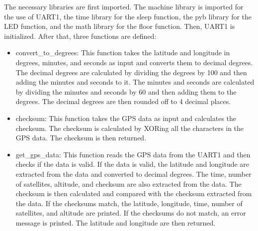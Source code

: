 \documentclass{report}
\begin{document}
The necessary libraries are first imported. The machine library is imported for the use of UART1, the time library for the sleep function, the pyb library for the LED function, and the math library for the floor function. Then, UART1 is initialized\cite{q}. After that, three functions are defined:
\begin{itemize}
    \item convert\_to\_degrees: This function takes the latitude and longitude in degrees, minutes, and seconds as input and converts them to decimal degrees. The decimal degrees are calculated by dividing the degrees by 100 and then adding the minutes and seconds to it. The minutes and seconds are calculated by dividing the minutes and seconds by 60 and then adding them to the degrees. The decimal degrees are then rounded off to 4 decimal places.
    \item checksum: This function takes the GPS data as input and calculates the checksum. The checksum is calculated by XORing all the characters in the GPS data. The checksum is then returned.
    \item get\_gps\_data: This function reads the GPS data from the UART1 and then checks if the data is valid. If the data is valid, the latitude and longitude are extracted from the data and converted to decimal degrees. The time, number of satellites, altitude, and checksum are also extracted from the data. The checksum is then calculated and compared with the checksum extracted from the data. If the checksums match, the latitude, longitude, time, number of satellites, and altitude are printed. If the checksums do not match, an error message is printed. The latitude and longitude are then returned.
\end{itemize}
\end{document}

